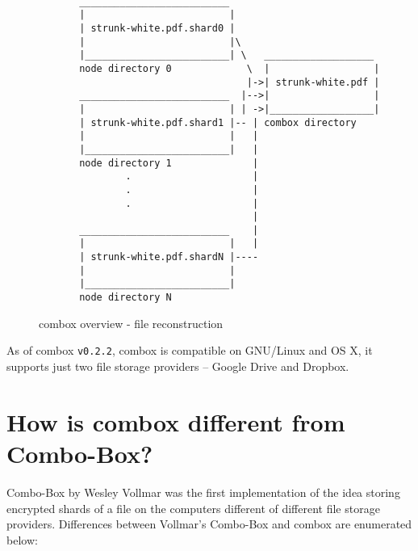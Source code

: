 \begin{figure}[h]
\begin{verbatim}

       __________________________
       |                         |
       | strunk-white.pdf.shard0 |
       |                         |\
       |_________________________| \   ___________________
       node directory 0             \  |                  |
                                    |->| strunk-white.pdf |
       __________________________  |-->|                  |
       |                         | | ->|__________________|
       | strunk-white.pdf.shard1 |-- | combox directory
       |                         |   |
       |_________________________|   |
       node directory 1              |
               .                     |
               .                     |
               .                     |
                                     |
       __________________________    |
       |                         |   |
       | strunk-white.pdf.shardN |----
       |                         |
       |_________________________|
       node directory N

\end{verbatim}
\caption{combox overview - file reconstruction}
\label{fig:1-combox-overview-1}
\end{figure}

As of combox \verb+v0.2.2+, combox is compatible on GNU/Linux and OS
X, it supports just two file storage providers -- Google Drive and
Dropbox.

\section{How is combox different from Combo-Box?}\label{1-sec-cb-diff}

Combo-Box by Wesley Vollmar\cite{vollmar-combo-box} was the first
implementation of the idea storing encrypted shards of a file on the
computers different of different file storage providers. Differences
between Vollmar's Combo-Box and combox are enumerated below:

